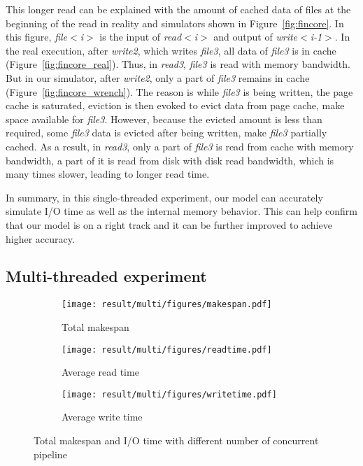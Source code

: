 \documentclass[conference]{IEEEtran}
\begin{document}
			This longer read can be explained with the amount of cached data of files 
			at the beginning of the read in reality and simulators shown in Figure~\ref{fig:fincore}. 			
			In this figure, \textit{file$<$i$>$} is the input of \textit{read$<$i$>$} and 
			output of \textit{write$<$i-1$>$}. 
			In the real execution, after \textit{write2}, which writes \textit{file3}, 
			all data of \textit{file3} is in cache (Figure~\ref{fig:fincore_real}). 
			Thus, in \textit{read3}, \textit{file3} is read with memory bandwidth. 
			But in our simulator, after \textit{write2}, only a part of \textit{file3} 
			remains in cache (Figure~\ref{fig:fincore_wrench}). 
			The reason is while \textit{file3}  is being written, the page cache is saturated, 
			eviction is then evoked to evict data from page cache, make space 
			available for \textit{file3}. 
			However, because the evicted amount is less than required, 
			some \textit{file3} data is evicted after being written, make \textit{file3} 
			partially cached. 
			As a result, in \textit{read3}, only a part of \textit{file3} is read from cache 
			with memory bandwidth, a part of it is read from disk with disk read bandwidth, 
			which is many times slower, leading to longer read time. 			
			
			In summary, in this single-threaded experiment, our model can accurately 
			simulate I/O time as well as the internal memory behavior. 
			This can help confirm that our model is on a right track and 
			it can be further improved to achieve higher accuracy.
			
		\subsection{Multi-threaded experiment}
		
			\begin{figure*}
			\begin{subfigure}{0.33\linewidth}
				\centering
   				\texttt{[image: result/multi/figures/makespan.pdf]}
   				\caption{Total makespan}	
   				\label{fig:multi_makespan}
			\end{subfigure}	
			\begin{subfigure}{0.33\linewidth}
				\centering
   				\texttt{[image: result/multi/figures/readtime.pdf]}
   				\caption{Average read time}	
   				\label{fig:multi_readtime}
			\end{subfigure}	
			\begin{subfigure}{0.33\linewidth}
				\centering
   				\texttt{[image: result/multi/figures/writetime.pdf]}
   				\caption{Average write time}	
   				\label{fig:multi_writetime}
			\end{subfigure}		
			\caption{Total makespan and I/O time with different number of concurrent pipeline}
			\label{fig:multi_result}
			\end{figure*}		
			
\end{document}
